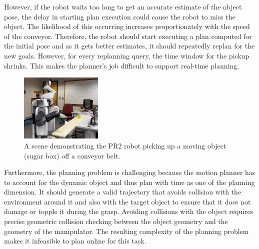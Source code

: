 \documentclass[conference]{IEEEtran}
\begin{document}
However, if the robot waits too long to get an accurate estimate of the object pose, the delay in starting plan execution could cause the robot to miss the object. The likelihood of this occurring increases proportionately with the speed of the conveyor. Therefore, the robot should start executing a plan computed for the initial pose and as it gets better estimates, it should repeatedly replan for the new goals. However, for every replanning query, the time window for the pickup shrinks. This makes the planner's job difficult to support real-time planning.

\begin{figure}[t]
    \centering
    \includegraphics[trim=0 50 0 100, clip, width=0.35\textwidth]{figs/cover_pic.jpg}
    \caption{
    \CaptionTextSize
    A scene demonstrating the PR2 robot picking up a moving object (sugar box) off a conveyor belt.}
    \label{fig:intro_pic}
\end{figure}


Furthermore, the planning problem is challenging because the motion planner has to account for the dynamic object and thus plan with time as one of the planning dimension. It should generate a valid trajectory that avoids collision with the environment around it and also with the target object to ensure that it does not damage or topple it during the grasp. Avoiding collisions with the object requires precise geometric collision checking between the object geometry and the geometry of the manipulator. The resulting complexity of the planning problem makes it infeasible to plan online for this task.
\end{document}
